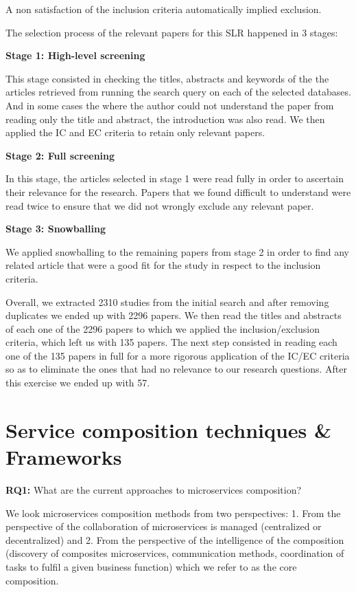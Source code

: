 \documentclass{article}
\begin{document}
\begin{multicols}{2}
A non satisfaction of the inclusion criteria automatically implied exclusion. 

The selection process of the relevant papers for this SLR happened in 3 stages:

\textbf{Stage 1: High-level screening}

This stage consisted in checking the titles, abstracts and keywords of the the articles retrieved from running the search query on each of the selected databases.  And in some cases the where the author could not understand the paper from reading only the title and abstract, the introduction was also read. We then applied the IC and EC criteria to retain only relevant papers.

\textbf{Stage 2: Full screening}

In this stage, the articles selected in stage 1 were read fully in order to ascertain their relevance for the research. Papers that we found difficult to understand were read twice to ensure that we did not wrongly exclude any relevant paper.

\textbf{Stage 3: Snowballing}

We applied snowballing to the remaining papers from stage 2 in order to find any related article that were a good fit for the study in respect to the inclusion criteria.  

Overall, we extracted 2310 studies from the initial search and after removing duplicates we ended up with 2296 papers. We then read the titles and abstracts of each one of the 2296 papers to which we applied the inclusion/exclusion criteria, which left us with 135 papers. The next step consisted in reading each one of the 135 papers in full for a more rigorous application of the IC/EC criteria so as to eliminate the ones that had no relevance to our research questions. After this exercise we ended up with 57.

\section{Service composition techniques \& Frameworks}

\textbf{RQ1:}  What are the current approaches to microservices composition?

We look microservices composition methods from two perspectives: 1. From the perspective of the collaboration of microservices is managed (centralized or decentralized) and 2. From the perspective of the intelligence of the composition (discovery of composites microservices, communication methods, coordination of tasks to fulfil a given business function) which we refer to as the core composition.



\end{multicols}
\end{document}
